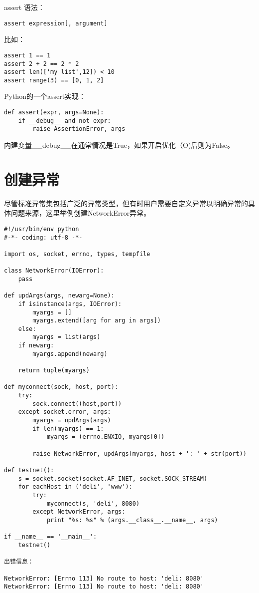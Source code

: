 \documentclass[11pt,a4paper]{article}
\begin{document}
\begin{CJK*}{UTF8}{nsung}
assert 语法：
\begin{verbatim}
assert expression[, argument]
\end{verbatim}
比如：
\begin{verbatim}
assert 1 == 1
assert 2 + 2 == 2 * 2
assert len(['my list',12]) < 10
assert range(3) == [0, 1, 2]
\end{verbatim}
Python的一个assert实现：
\begin{verbatim}
def assert(expr, args=None):
    if __debug__ and not expr:
        raise AssertionError, args
\end{verbatim}
内建变量\_\_debug\_\_在通常情况是True，如果开启优化（\-O)后则为False。


\section{创建异常}

尽管标准异常集包括广泛的异常类型，但有时用户需要自定义异常以明确异常的具体问题来源，这里举例创建NetworkError异常。\par

\begin{verbatim}
#!/usr/bin/env python
#-*- coding: utf-8 -*-

import os, socket, errno, types, tempfile

class NetworkError(IOError):
    pass

def updArgs(args, newarg=None):
    if isinstance(args, IOError):
        myargs = []
        myargs.extend([arg for arg in args])
    else:
        myargs = list(args)
    if newarg:
        myargs.append(newarg)
    
    return tuple(myargs)

def myconnect(sock, host, port):
    try:
        sock.connect((host,port))
    except socket.error, args:
        myargs = updArgs(args)
        if len(myargs) == 1:
            myargs = (errno.ENXIO, myargs[0])
    
        raise NetworkError, updArgs(myargs, host + ': ' + str(port))

def testnet():
    s = socket.socket(socket.AF_INET, socket.SOCK_STREAM)
    for eachHost in ('deli', 'www'):
        try:
            myconnect(s, 'deli', 8080)
        except NetworkError, args:
            print "%s: %s" % (args.__class__.__name__, args)

if __name__ == '__main__':
    testnet()

出错信息：

NetworkError: [Errno 113] No route to host: 'deli: 8080'
NetworkError: [Errno 113] No route to host: 'deli: 8080'
\end{verbatim}


\end{CJK*}
\end{document}
